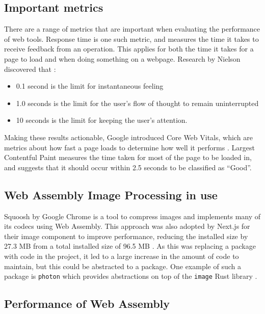 \documentclass[12pt,a4paper]{article}
\begin{document}
\subsection{Important metrics}

There are a range of metrics that are important when evaluating the performance of web tools. Response time is one such metric, and measures the time it takes to receive feedback from an operation. This applies for both the time it takes for a page to load and when doing something on a webpage. Research by Nielson discovered that \cite{nielsen1994usability}:
\begin{itemize}
    \item 0.1 second is the limit for instantaneous feeling
    \item 1.0 seconds is the limit for the user's flow of thought to remain uninterrupted
    \item 10 seconds is the limit for keeping the user's attention.
\end{itemize}

Making these results actionable, Google introduced Core Web Vitals, which are metrics about how fast a page loads to determine how well it performs \cite{webvitals}. Largest Contentful Paint measures the time taken for most of the page to be loaded in, and suggests that it should occur within 2.5 seconds to be classified as “Good”.




\subsection{Web Assembly Image Processing in use}

Squoosh by Google Chrome is a tool to compress images and implements many of its codecs using Web Assembly. This approach was also adopted by Next.js for their image component to improve performance, reducing the installed size by 27.3 MB from a total installed size of 96.5 MB \cite{nextjs}. As this was replacing a package with code in the project, it led to a large increase in the amount of code to maintain, but this could be abstracted to a package. One example of such a package is \texttt{photon} which provides abstractions on top of the \texttt{image} Rust library \cite{photon}.




\subsection{Performance of Web Assembly}
\end{document}
